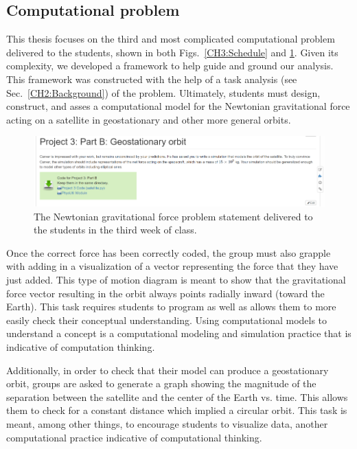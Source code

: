 \documentclass{msuphddissertation}
\begin{document}
\begin{doublespace}
\subsection{Computational problem}

This thesis focuses on the third and most complicated computational problem delivered to the students, shown in both Figs.~\ref{CH3:Schedule} and \ref{CH3:SatelliteProblem}. Given its complexity, we developed a framework to help guide and ground our analysis.  This framework was constructed with the help of a task analysis (see Sec.~\ref{CH2:Background}) of the problem.  Ultimately, students must design, construct, and asses a computational model for the Newtonian gravitational force acting on a satellite in geostationary and other more general orbits.

\begin{figure}[ht]\centering
\includegraphics[scale=1]{images/CH3SatelliteProblem.pdf}
\caption{The Newtonian gravitational force problem statement delivered to the students in the third week of class.}\label{CH3:SatelliteProblem}
\end{figure}

Once the correct force has been correctly coded, the group must also grapple with adding in a visualization of a vector representing the force that they have just added.  This type of motion diagram is meant to show that the gravitational force vector resulting in the orbit always points radially inward (toward the Earth).  This task requires students to program as well as allows them to more easily check their conceptual understanding.  Using computational models to understand a concept is a computational modeling and simulation practice that is indicative of computation thinking.

Additionally, in order to check that their model can produce a geostationary orbit, groups are asked to generate a graph showing the magnitude of the separation between the satellite and the center of the Earth vs. time.  This allows them to check for a constant distance which implied a circular orbit.  This task is meant, among other things, to encourage students to visualize data, another computational practice indicative of computational thinking.


\end{doublespace}
\end{document}

